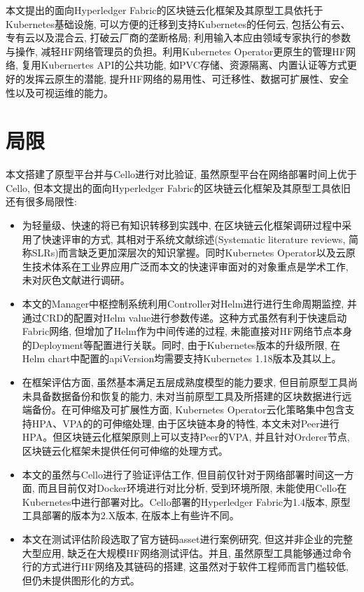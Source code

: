 本文提出的面向Hyperledger Fabric的区块链云化框架及其原型工具依托于Kubernetes基础设施, 可以方便的迁移到支持Kubernetes的任何云, 包括公有云、专有云以及混合云, 打破云厂商的垄断格局; 利用输入本应由领域专家执行的参数与操作, 减轻HF网络管理员的负担。利用Kubernetes Operator更原生的管理HF网络, 复用Kubernertes API的公共功能, 如PVC存储、资源隔离、内置认证等方式更好的发挥云原生的潜能, 提升HF网络的易用性、可迁移性、数据可扩展性、安全性以及可视运维的能力。

\section{局限}

本文搭建了原型平台并与Cello进行对比验证, 虽然原型平台在网络部署时间上优于Cello, 但本文提出的面向Hyperledger Fabric的区块链云化框架及其原型工具依旧还有很多局限性:

\begin{itemize}[itemindent=2em]
    \item 为轻量级、快速的将已有知识转移到实践中, 在区块链云化框架调研过程中采用了快速评审的方式, 其相对于系统文献综述(Systematic literature reviews, 简称SLRs)而言缺乏更加深层次的知识掌握。同时Kubernetes Operator以及云原生技术体系在工业界应用广泛而本文的快速评审面对的对象重点是学术工作, 未对灰色文献进行调研。

    \item 本文的Manager中枢控制系统利用Controller对Helm进行进行生命周期监控, 并通过CRD的配置对Helm value进行参数传递。这种方式虽然有利于快速启动Fabric网络, 但增加了Helm作为中间传递的过程, 未能直接对HF网络节点本身的Deployment等配置进行关联。同时, 由于Kubernetes版本的升级所限, 在Helm chart中配置的apiVersion均需要支持Kubernetes 1.18版本及其以上。

    \item 在框架评估方面, 虽然基本满足五层成熟度模型的能力要求, 但目前原型工具尚未具备数据备份和恢复的能力, 未对当前原型工具及所搭建的区块数据进行远端备份。在可伸缩及可扩展性方面, Kubernetes Operator云化策略集中包含支持HPA、VPA的的可伸缩处理, 由于区块链本身的特性, 本文未对Peer进行HPA。但区块链云化框架原则上可以支持Peer的VPA, 并且针对Orderer节点, 区块链云化框架未提供任何可伸缩的处理方式。

    \item 本文的虽然与Cello进行了验证评估工作, 但目前仅针对于网络部署时间这一方面, 而且目前仅对Docker环境进行对比分析, 受到环境所限, 未能使用Cello在Kubernetes中进行部署对比。Cello部署的Hyperledger Fabric为1.4版本, 原型工具部署的版本为2.X版本, 在版本上有些许不同。

    \item 本文在测试评估阶段选取了官方链码asset进行案例研究, 但这并非企业的完整大型应用, 缺乏在大规模HF网络测试评估。并且, 虽然原型工具能够通过命令行的方式进行HF网络及其链码的搭建, 这虽然对于软件工程师而言门槛较低, 但仍未提供图形化的方式。

\end{itemize}



